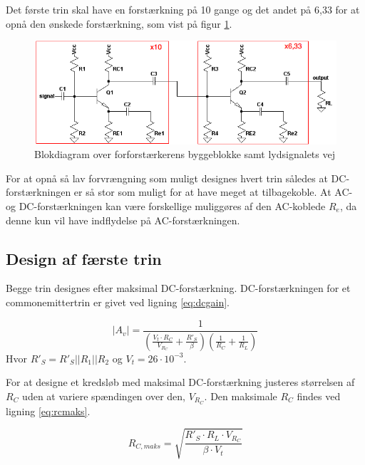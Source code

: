 Det første trin skal have en forstærkning på 10 gange og det andet på 6,33 for at opnå den ønskede forstærkning, som vist på figur \ref{blok_forforstaerker}.

\begin{figure}[h]
\centering
\includegraphics[scale=.6]{teknisk/forforstaerker/blok_forforstaerker.png}
\caption{Blokdiagram over forforstærkerens byggeblokke samt lydsignalets vej}
\label{blok_forforstaerker}
\end{figure}

For at opnå så lav forvrængning som muligt designes hvert trin således at DC-forstærkningen er så stor som muligt for at have meget at tilbagekoble. At AC- og DC-forstærkningen kan være forskellige muliggøres af den AC-koblede $R_e$, da denne kun vil have indflydelse på AC-forstærkningen.

\subsection*{Design af færste trin}
Begge trin designes efter maksimal DC-forstærkning. DC-forstærkningen for et commonemittertrin er givet ved ligning \ref{eq:dcgain}.

\begin{equation}
|A_{v}|=\frac{1}{\left(\frac{V_t \cdot R_C}{V_{R_C}}+\frac{R'_S}{\beta}\right) \left(\frac{1}{R_C}+\frac{1}{R_L}\right)}
\label{eq:dcgain}
\end{equation}
Hvor $R'_S = R'_S||R_1||R_2$ og $V_t = 26 \cdot 10^{-3}$.

For at designe et kredsløb med maksimal DC-forstærkning justeres størrelsen af $R_C$ uden at variere spændingen over den, $V_{R_C}$. Den maksimale $R_C$ findes ved ligning \ref{eq:rcmaks}.

\begin{equation}
R_{C,maks} = \sqrt{\frac{R'_S \cdot R_L \cdot V_{R_C}}{\beta \cdot V_t}}
\label{eq:rcmaks}
\end{equation}

